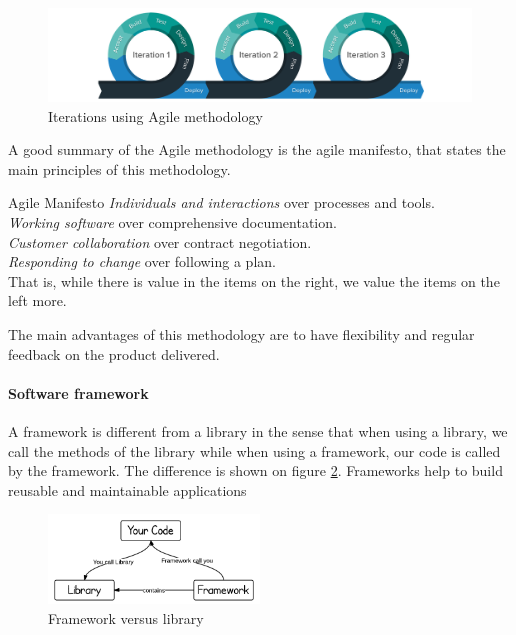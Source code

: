 \begin{figure}
    \centering
    \includegraphics[width=\textwidth]{images/agile-methodolody.png}
    \caption{Iterations using Agile methodology}
    \label{fig:agile-methodology}
\end{figure}

A good summary of the Agile methodology is the agile manifesto\cite{agilemanifesto}, that states the main principles of this methodology.

\begin{bclogo}[logo=\bctrombone]{Agile Manifesto \cite{agilemanifesto}}
\emph{Individuals and interactions} over processes and tools.\\
\emph{Working software} over comprehensive documentation.\\
\emph{Customer collaboration} over contract negotiation.\\
\emph{Responding to change} over following a plan. \\
That is, while there is value in the items on
the right, we value the items on the left more.
\end{bclogo}

The main advantages of this methodology are to have flexibility and regular feedback on the product delivered.

\paragraph{Software framework}

A framework is different from a library in the sense that when using a library, we call the methods of the library while when using a framework, our code is called by the framework. The difference is shown on figure \ref{fig:framework-vs-library}. Frameworks help to build reusable and maintainable applications 

\begin{figure}
    \centering
    \includegraphics[width=0.5\textwidth]{images/framework-vs-library.png}
    \caption{Framework versus library}
    \label{fig:framework-vs-library}
\end{figure}


